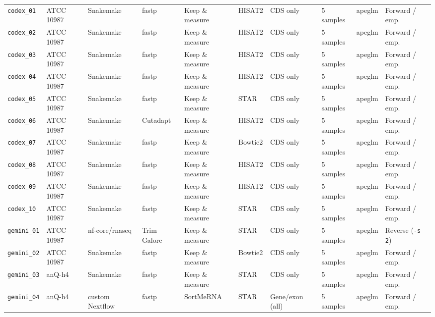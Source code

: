 \documentclass[11pt,letterpaper]{article}
\newcommand{\tool}[1]{\textsf{#1}}
\begin{document}
\begin{table}[!htbp]
{\begin{tabular}{@{}llllllllll@{}}
\addlinespace[0.2em]
\texttt{codex\_01} & ATCC 10987 & \tool{Snakemake} & \tool{fastp} & Keep \& measure & \tool{HISAT2} & CDS only & 5 samples & apeglm & Forward / emp. \\
\texttt{codex\_02} & ATCC 10987 & \tool{Snakemake} & \tool{fastp} & Keep \& measure & \tool{HISAT2} & CDS only & 5 samples & apeglm & Forward / emp. \\
\texttt{codex\_03} & ATCC 10987 & \tool{Snakemake} & \tool{fastp} & Keep \& measure & \tool{HISAT2} & CDS only & 5 samples & apeglm & Forward / emp. \\
\texttt{codex\_04} & ATCC 10987 & \tool{Snakemake} & \tool{fastp} & Keep \& measure & \tool{HISAT2} & CDS only & 5 samples & apeglm & Forward / emp. \\
\texttt{codex\_05} & ATCC 10987 & \tool{Snakemake} & \tool{fastp} & Keep \& measure & \tool{STAR} & CDS only & 5 samples & apeglm & Forward / emp. \\
\texttt{codex\_06} & ATCC 10987 & \tool{Snakemake} & \tool{Cutadapt} & Keep \& measure & \tool{HISAT2} & CDS only & 5 samples & apeglm & Forward / emp. \\
\texttt{codex\_07} & ATCC 10987 & \tool{Snakemake} & \tool{fastp} & Keep \& measure & \tool{Bowtie2} & CDS only & 5 samples & apeglm & Forward / emp. \\
\texttt{codex\_08} & ATCC 10987 & \tool{Snakemake} & \tool{fastp} & Keep \& measure & \tool{HISAT2} & CDS only & 5 samples & apeglm & Forward / emp. \\
\texttt{codex\_09} & ATCC 10987 & \tool{Snakemake} & \tool{fastp} & Keep \& measure & \tool{HISAT2} & CDS only & 5 samples & apeglm & Forward / emp. \\
\texttt{codex\_10} & ATCC 10987 & \tool{Snakemake} & \tool{fastp} & Keep \& measure & \tool{STAR} & CDS only & 5 samples & apeglm & Forward / emp. \\
\addlinespace[0.2em]
\texttt{gemini\_01} & ATCC 10987 & \tool{nf-core/rnaseq} & \tool{Trim Galore} & Keep \& measure & \tool{STAR} & CDS only & 5 samples & apeglm & Reverse (\texttt{-s 2}) \\
\texttt{gemini\_02} & ATCC 10987 & \tool{Snakemake} & \tool{fastp} & Keep \& measure & \tool{Bowtie2} & CDS only & 5 samples & apeglm & Forward / emp. \\
\texttt{gemini\_03} & anQ-h4 & \tool{Snakemake} & \tool{fastp} & Keep \& measure & \tool{STAR} & CDS only & 5 samples & apeglm & Forward / emp. \\
\texttt{gemini\_04} & anQ-h4 & custom \tool{Nextflow} & \tool{fastp} & \tool{SortMeRNA} & \tool{STAR} & Gene/exon (all) & 5 samples & apeglm & Forward / emp. \\

\end{tabular}}
\end{table}
\end{document}
